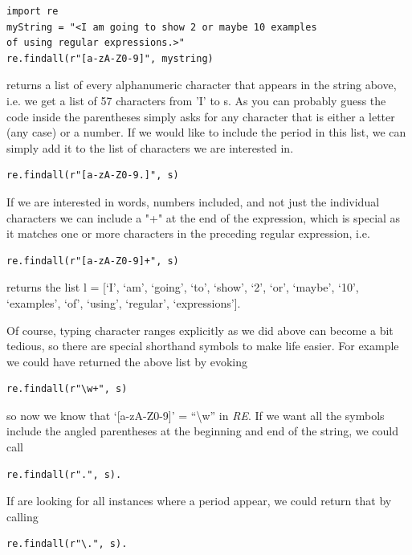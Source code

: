 \begin{verbatim}
import re
myString = "<I am going to show 2 or maybe 10 examples
of using regular expressions.>"
re.findall(r"[a-zA-Z0-9]", mystring)    
\end{verbatim}

returns a list of every alphanumeric character that appears in the string above, i.e. we get a list of 57 characters from 'I' to 
s. As you can probably guess the code inside the parentheses simply asks for any character that is either a letter (any case) 
or a number. If we would like to include the period in this list, we can simply add it to the list of characters we are 
interested in.

\begin{verbatim}
re.findall(r"[a-zA-Z0-9.]", s)    
\end{verbatim}

If we are interested in words, numbers included, and not just the individual characters we can include a "+" at the end of the expression, which is special as it 
matches one or more characters in the preceding regular expression, i.e.

\begin{verbatim}
re.findall(r"[a-zA-Z0-9]+", s)    
\end{verbatim}

returns the list l = [`I',
 `am',
 `going',
 `to',
 `show',
 `2',
 `or',
 `maybe',
 `10',
 `examples',
 `of',
 `using',
 `regular',
 `expressions']. 


 Of course, typing character ranges explicitly as we did above can become a bit tedious, so there are special shorthand symbols to make life easier. For example
 we could have returned the above list by evoking

 \begin{verbatim}
re.findall(r"\w+", s)    
\end{verbatim}

so now we know that `[a-zA-Z0-9]' = ``\textbackslash w'' in \textit{RE}. If we want all the symbols include the angled parentheses at the beginning and end of the string, we could 
call


 \begin{verbatim}
re.findall(r".", s).    
\end{verbatim}

If are looking for all instances where a period appear, we could return that by calling

\begin{verbatim}
re.findall(r"\.", s).    
\end{verbatim}

